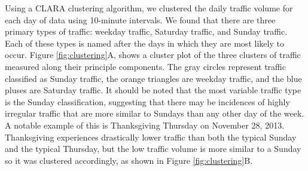 \documentclass{report}
\begin{document}
Using a CLARA clustering algorithm, we clustered the daily traffic volume
for each day of data using 10-minute intervals. We found that there are three
primary types of traffic: weekday traffic, Saturday traffic, and Sunday traffic.
Each of these types is named after the days in which they are most likely to
occur. Figure \ref{fig:clustering}A, shows a cluster plot of the three clusters
of traffic measured along their principle components. The gray circles represent
traffic classified as Sunday traffic, the orange triangles are weekday traffic, and
the blue pluses are Saturday traffic. It should be noted that the most variable traffic
type is the Sunday classification, suggesting that there may be incidences of
highly irregular traffic that are more similar to Sundays than any other day
of the week. A notable example of this is Thanksgiving Thursday on November 28,
2013. Thanksgiving experiences drastically lower traffic than both the typical
Sunday and the typical Thursday, but the low traffic volume is more similar to
a Sunday so it was clustered accordingly, as shown in Figure \ref{fig:clustering}B.
\end{document}
